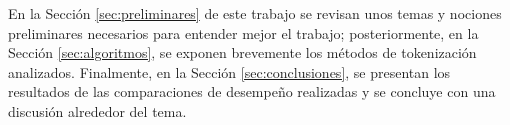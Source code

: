 
En la Sección \ref{sec:preliminares} de este trabajo se revisan unos temas y
nociones preliminares necesarios para entender mejor el trabajo; posteriormente,
en la Sección \ref{sec:algoritmos}, se exponen brevemente los métodos de
tokenización analizados. Finalmente, en la Sección \ref{sec:conclusiones}, se
presentan los resultados de las comparaciones de desempeño realizadas y se
concluye con una discusión alrededor del tema.



